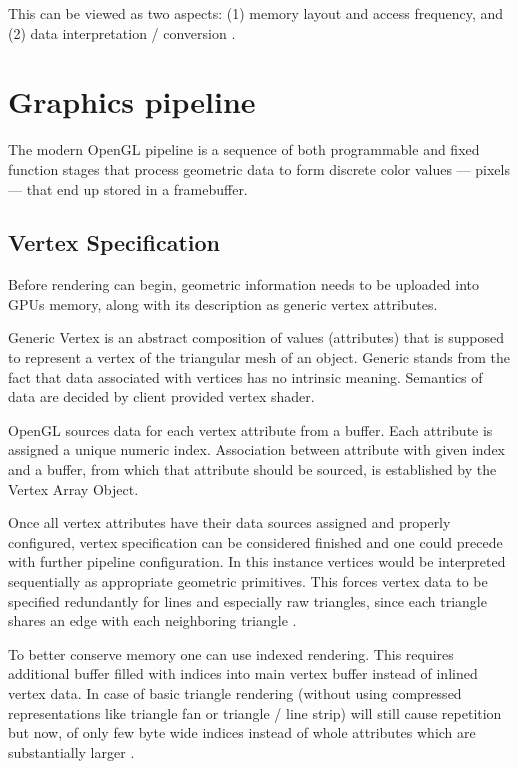 This can be viewed as two aspects: (1) memory layout and access frequency, and (2) data interpretation / conversion \cite{glwiki}.

\section{Graphics pipeline}
The modern OpenGL pipeline is a sequence of both programmable and fixed function stages that process geometric data to form discrete color values --- pixels --- that end up stored in a framebuffer.

\subsection{Vertex Specification}

Before rendering can begin, geometric information needs to be uploaded into GPUs memory, along with its description as generic vertex attributes.

Generic Vertex is an abstract composition of values (attributes) that is supposed to represent a vertex of the triangular mesh of an object.
Generic stands from the fact that data associated with vertices has no intrinsic meaning.
Semantics of data are decided by client provided vertex shader.

OpenGL sources data for each vertex attribute from a buffer. Each attribute is assigned a unique numeric index.
Association between attribute with given index and a buffer, from which that attribute should be sourced, is established by the Vertex Array Object.

Once all vertex attributes have their data sources assigned and properly configured, vertex specification can be considered finished and one could precede with further pipeline configuration.
In this instance vertices would be interpreted sequentially as appropriate geometric primitives. This forces vertex data to be specified redundantly for 
lines and especially raw triangles, since each triangle shares an edge with each neighboring triangle \cite{openglspec}.

To better conserve memory one can use indexed rendering. This requires additional buffer filled with indices into main vertex buffer instead of inlined vertex data.
In case of basic triangle rendering (without using compressed representations like triangle fan or triangle / line strip) 
will still cause repetition but now, of only few byte wide indices instead of whole attributes which are substantially larger \cite{openglspec}.

